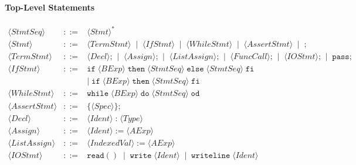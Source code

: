 \documentclass{article}
\begin{document}
\paragraph{Top-Level Statements}
\[
\begin{array}{rcl}
\langle \mathit{StmtSeq} \rangle
&::=&
\langle \mathit{Stmt} \rangle^* \\[4pt]

\langle \mathit{Stmt} \rangle
&::=&
\langle \mathit{TermStmt} \rangle
\;\mid\;
\langle \mathit{IfStmt} \rangle
\;\mid\;
\langle \mathit{WhileStmt} \rangle
\;\mid\;
\langle \mathit{AssertStmt} \rangle
\;\mid\;
\texttt{;} \\[4pt]

\langle \mathit{TermStmt} \rangle
&::=&
\langle \mathit{Decl} \rangle\texttt{;}
\;\mid\;
\langle \mathit{Assign} \rangle\texttt{;}
\;\mid\;
\langle \mathit{ListAssign} \rangle\texttt{;}
\;\mid\;
\langle \mathit{FuncCall} \rangle\texttt{;}
\;\mid\;
\langle \mathit{IOStmt} \rangle\texttt{;}
\;\mid\;
\mathtt{pass}\texttt{;} \\[4pt]

\langle \mathit{IfStmt} \rangle
&::=&
\mathtt{if}\;\langle \mathit{BExp} \rangle\;\mathtt{then}\;\langle \mathit{StmtSeq} \rangle\;\mathtt{else}\;\langle \mathit{StmtSeq} \rangle\;\mathtt{fi} \\
&& \mid\;
\mathtt{if}\;\langle \mathit{BExp} \rangle\;\mathtt{then}\;\langle \mathit{StmtSeq} \rangle\;\mathtt{fi} \\[4pt]

\langle \mathit{WhileStmt} \rangle
&::=&
\mathtt{while}\;\langle \mathit{BExp} \rangle\;\mathtt{do}\;\langle \mathit{StmtSeq} \rangle\;\mathtt{od} \\[4pt]

\langle \mathit{AssertStmt} \rangle
&::=&
\{\langle \mathit{Spec} \rangle\}\texttt{;} \\[4pt]

\langle \mathit{Decl} \rangle
&::=&
\langle \mathit{Ident} \rangle\;\texttt{:}\;\langle \mathit{Type} \rangle \\[4pt]

\langle \mathit{Assign} \rangle
&::=&
\langle \mathit{Ident} \rangle\;\texttt{:=}\;\langle \mathit{AExp} \rangle \\[4pt]

\langle \mathit{ListAssign} \rangle
&::=&
\langle \mathit{IndexedVal} \rangle\;\texttt{:=}\;\langle \mathit{AExp} \rangle \\[4pt]

\langle \mathit{IOStmt} \rangle
&::=&
\mathtt{read()} 
\;\mid\; \mathtt{write}\;\langle \mathit{Ident} \rangle
\;\mid\; \mathtt{writeline}\;\langle \mathit{Ident} \rangle

\end{array}
\]
\end{document}
